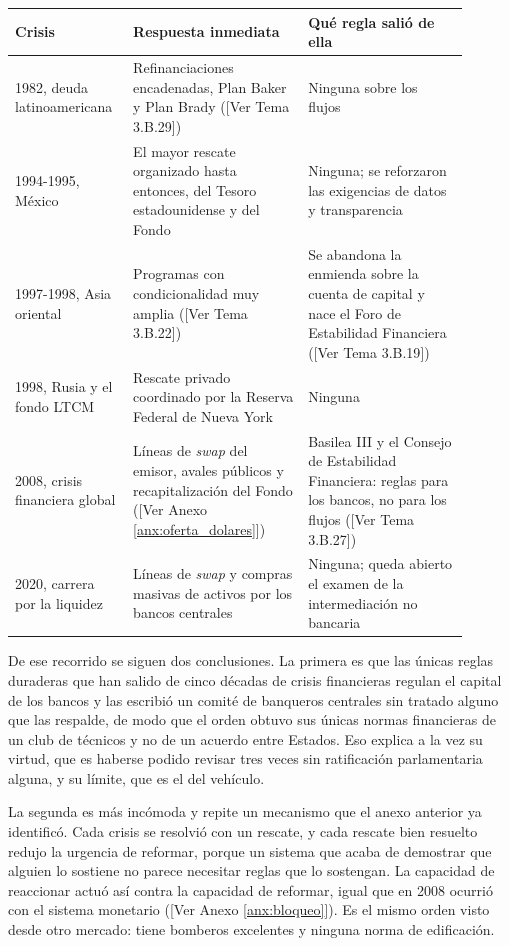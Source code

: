 \documentclass[10pt,a4paper]{article}
\newcommand{\authorfont}[1]{{\fontfamily{EBGaramond-TLF}\selectfont #1}}
\newcounter{anexo}
\begin{document}
\begin{center}
{\footnotesize
\begin{tabular}{|p{0.21\linewidth}|p{0.36\linewidth}|p{0.33\linewidth}|}
\hline
\textbf{Crisis} & \textbf{Respuesta inmediata} & \textbf{Qué regla salió de ella} \\
\hline
1982, deuda latinoamericana & Refinanciaciones encadenadas, Plan Baker y Plan Brady ([\authorfont{Ver Tema 3.B.29}]) & Ninguna sobre los flujos \\
\hline
1994-1995, México & El mayor rescate organizado hasta entonces, del Tesoro estadounidense y del Fondo & Ninguna; se reforzaron las exigencias de datos y transparencia \\
\hline
1997-1998, Asia oriental & Programas con condicionalidad muy amplia ([\authorfont{Ver Tema 3.B.22}]) & Se abandona la enmienda sobre la cuenta de capital y nace el Foro de Estabilidad Financiera ([\authorfont{Ver Tema 3.B.19}]) \\
\hline
1998, Rusia y el fondo LTCM & Rescate privado coordinado por la Reserva Federal de Nueva York & Ninguna \\
\hline
2008, crisis financiera global & Líneas de \textit{swap} del emisor, avales públicos y recapitalización del Fondo ([\authorfont{Ver Anexo \ref{anx:oferta_dolares}}]) & Basilea III y el Consejo de Estabilidad Financiera: reglas para los bancos, no para los flujos ([\authorfont{Ver Tema 3.B.27}]) \\
\hline
2020, carrera por la liquidez & Líneas de \textit{swap} y compras masivas de activos por los bancos centrales & Ninguna; queda abierto el examen de la intermediación no bancaria \\
\hline
\end{tabular}}
\end{center}

De ese recorrido se siguen dos conclusiones. La primera es que las únicas reglas duraderas que han salido de cinco décadas de crisis financieras regulan el capital de los bancos y las escribió un comité de banqueros centrales sin tratado alguno que las respalde, de modo que el orden obtuvo sus únicas normas financieras de un club de técnicos y no de un acuerdo entre Estados. Eso explica a la vez su virtud, que es haberse podido revisar tres veces sin ratificación parlamentaria alguna, y su límite, que es el del vehículo.

La segunda es más incómoda y repite un mecanismo que el anexo anterior ya identificó. Cada crisis se resolvió con un rescate, y cada rescate bien resuelto redujo la urgencia de reformar, porque un sistema que acaba de demostrar que alguien lo sostiene no parece necesitar reglas que lo sostengan. La capacidad de reaccionar actuó así contra la capacidad de reformar, igual que en 2008 ocurrió con el sistema monetario ([\authorfont{Ver Anexo \ref{anx:bloqueo}}]). Es el mismo orden visto desde otro mercado: tiene bomberos excelentes y ninguna norma de edificación.
\end{document}

